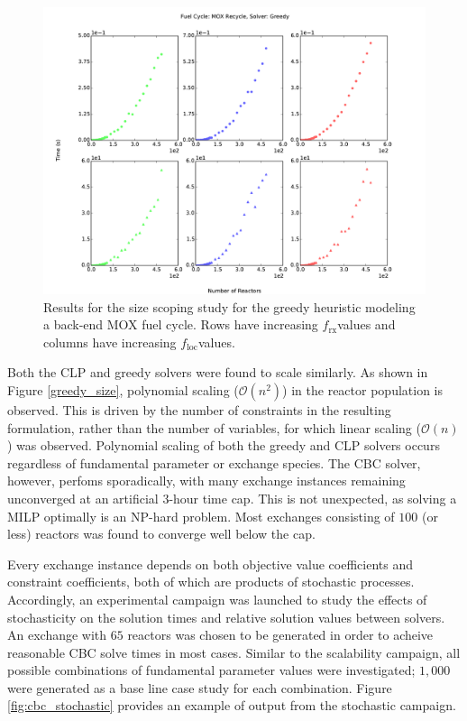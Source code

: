 \documentclass{anstrans}
\newcommand{\frx}{$f_{\text{rx}}$}
\newcommand{\floc}{$f_{\text{loc}}$}
\begin{document}
\begin{figure}
  \begin{center}
    \includegraphics[width=1.5\columnwidth]{base_back_n_rxtr_time_fc1_solvergreedy.pdf}
    \caption[]{
      \label{fig:greedy_size}
      Results for the size scoping study for the greedy heuristic modeling a
      back-end MOX fuel cycle. Rows have increasing \frx values and columns have
      increasing \floc values.}
  \end{center}
\end{figure}

Both the CLP and greedy solvers were found to scale similarly. As shown in
Figure \ref{greedy_size}, polynomial scaling ($\mathcal{O}(n^2)$) in the reactor
population is observed. This is driven by the number of constraints in the
resulting formulation, rather than the number of variables, for which linear
scaling ($\mathcal{O}(n)$) was observed. Polynomial scaling of both the greedy
and CLP solvers occurs regardless of fundamental parameter or exchange
species. The CBC solver, however, perfoms sporadically, with many exchange
instances remaining unconverged at an artificial $3$-hour time cap. This is not
unexpected, as solving a MILP optimally is an NP-hard problem. Most exchanges
consisting of $100$ (or less) reactors was found to converge well below the cap.

Every exchange instance depends on both objective value coefficients and
constraint coefficients, both of which are products of stochastic
processes. Accordingly, an experimental campaign was launched to study the
effects of stochasticity on the solution times and relative solution values
between solvers. An exchange with $65$ reactors was chosen to be generated in
order to acheive reasonable CBC solve times in most cases. Similar to the
scalability campaign, all possible combinations of fundamental parameter values
were investigated; $1,000$ were generated as a base line case study for each
combination. Figure \ref{fig:cbc_stochastic} provides an example of output from
the stochastic campaign.
\end{document}
